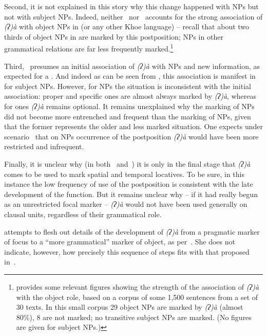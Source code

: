 \documentclass[output=paper]{LSP/langsci}
\begin{document}
Second, it is not explained in this story why this change happened with  NPs but not with subject NPs. Indeed, neither~ nor~ accounts for the strong association of \textit{(ʔ)à} with object NPs in  (or any other Khoe language) – recall that about two thirds of object NPs in  are marked by this postposition; NPs in other grammatical relations are far less frequently marked.\footnote{\citet[356–357]{Kilian-Hatz2013Kxoe} provides some relevant figures showing the strength of the association of \textit{(ʔ)à} with the object role, based on a corpus of some 1,500 sentences from a set of 30 texts. In this small corpus 29 object NPs are marked by \textit{(ʔ)à} (\ie almost 80\%), 8 are not marked; no transitive subject NPs are marked. (No figures are given for  subject NPs.)}

Third,~ presumes an initial association of \textit{(ʔ)à} with  NPs and new information, as expected for a . And indeed as can be seen from , this association is manifest in  for subject NPs. However, for  NPs the situation is inconsistent with the initial association:  proper and specific ones are almost always marked by \textit{(ʔ)à}, whereas for  ones \textit{(ʔ)à} remains optional. It remains unexplained why the marking of   NPs did not become more entrenched and frequent than the marking of   NPs, given that the former represents the older and less marked situation. One expects under scenario~ that on  NPs occurrence of the postposition \textit{(ʔ)à} would have been more restricted and infrequent.

Finally, it is unclear why (in both~ and~) it is only in the final stage that \textit{(ʔ)à} comes to be used to mark spatial and temporal locatives. To be sure, in this instance the low frequency of use of the postposition is consistent with the late development of the function. But it remains unclear why – if it had really begun as an unrestricted focal marker – \textit{(ʔ)à} would not have been used generally on clausal units, regardless of their grammatical role.

\citet[378]{Kilian-Hatz2013Kxoe} attempts to flesh out details of the development of \textit{(ʔ)à} from a pragmatic marker of focus to a “more grammatical” marker of object, as per~. She does not indicate, however, how precisely this sequence of steps fits with that proposed in~.
\end{document}
